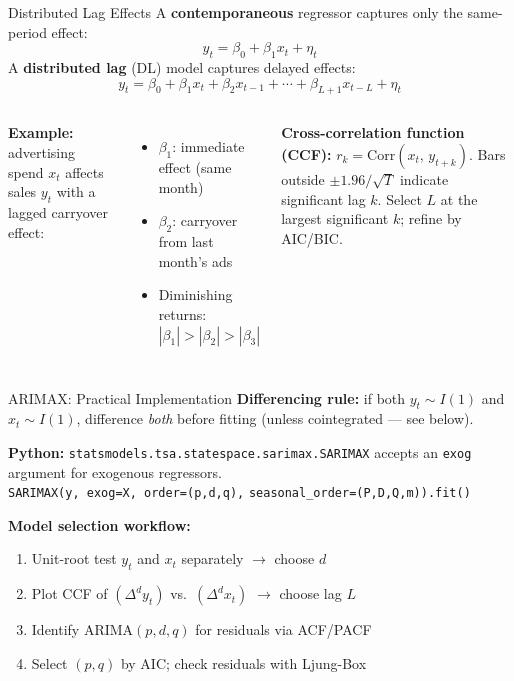 \documentclass[aspectratio=169, 11pt]{beamer}
\begin{document}
\begin{frame}{Distributed Lag Effects}
  A \textbf{contemporaneous} regressor captures only the same-period effect:
  \[
    y_t = \beta_0 + \beta_1 x_t + \eta_t
  \]
  A \textbf{distributed lag} (DL) model captures delayed effects:
  \[
    y_t = \beta_0 + \beta_1 x_t + \beta_2 x_{t-1} + \cdots
          + \beta_{L+1} x_{t-L} + \eta_t
  \]
  \begin{columns}[T]
      \textbf{Example:} advertising spend $x_t$ affects sales $y_t$
      with a lagged carryover effect:
      \begin{itemize}\small
        \item $\beta_1$: immediate effect (same month)
        \item $\beta_2$: carryover from last month's ads
        \item Diminishing returns: $|\beta_1| > |\beta_2| > |\beta_3|$
      \end{itemize}
      \begin{keybox}
        {\small \textbf{Cross-correlation function (CCF):}
        $r_k = \mathrm{Corr}(x_t,\, y_{t+k})$.
        Bars outside ${\pm}1.96/\!\sqrt{T}$ indicate significant lag $k$.
        Select $L$ at the largest significant $k$; refine by AIC/BIC.}
      \end{keybox}
  \end{columns}
\end{frame}

\begin{frame}{ARIMAX: Practical Implementation}
  \textbf{Differencing rule:} if both $y_t \sim I(1)$ and $x_t \sim I(1)$,
  difference \emph{both} before fitting (unless cointegrated --- see below).
  \begin{keybox}
    \textbf{Python:} \texttt{statsmodels.tsa.statespace.sarimax.SARIMAX}
    accepts an \texttt{exog} argument for exogenous regressors.\\[3pt]
    \texttt{SARIMAX(y, exog=X, order=(p,d,q),}
    \texttt{seasonal\_order=(P,D,Q,m)).fit()}
  \end{keybox}
  \textbf{Model selection workflow:}
  \begin{enumerate}\small
    \item Unit-root test $y_t$ and $x_t$ separately $\to$ choose $d$
    \item Plot CCF of $(\Delta^d y_t)$ vs.\ $(\Delta^d x_t)$ $\to$
          choose lag $L$
    \item Identify ARIMA$(p,d,q)$ for residuals via ACF/PACF
    \item Select $(p,q)$ by AIC; check residuals with Ljung-Box
  \end{enumerate}
\end{frame}
\end{document}
